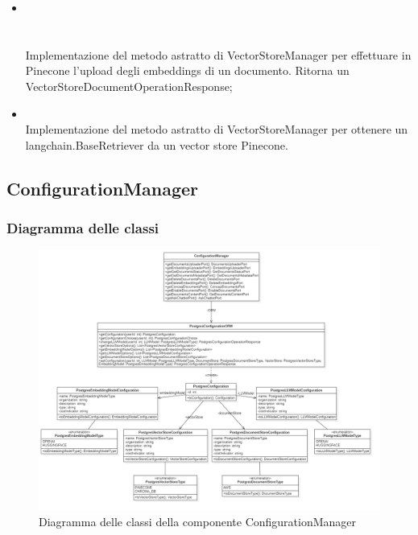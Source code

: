 \documentclass[10pt, a4paper]{article}
\begin{document}
\begin{itemize}
\begin{itemize}
        \item {}\\ 
        \\ 
        \\ 
        Implementazione del metodo astratto di VectorStoreManager per effettuare in Pinecone l'upload degli embeddings di un documento. Ritorna un VectorStoreDocumentOperationResponse;

        \item {}\\
        Implementazione del metodo astratto di VectorStoreManager per ottenere un langchain.BaseRetriever da un vector store Pinecone.
    \end{itemize}
\end{itemize}



\subsection{ConfigurationManager}
\subsubsection{Diagramma delle classi}

\begin{figure}[H]
    \centering        
    \includegraphics[width=16.5cm]{img/ConfigurationManager.png}
    \caption{Diagramma delle classi della componente ConfigurationManager}
\end{figure}
\end{document}
